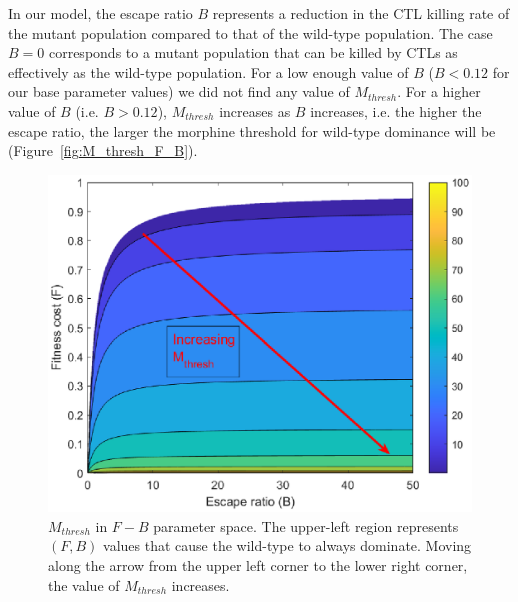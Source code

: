 \documentclass[11pt, oneside]{article}    %
\begin{document}
	In our model, the escape ratio $B$ represents a reduction in the CTL killing rate of the mutant population compared to that of the wild-type population. The case $B=0$ corresponds to a mutant population that can be killed by CTLs as effectively as the wild-type population. For a low enough value of $B$ ($B<0.12$ for our base parameter values) we did not find any value of $M_{thresh}$. For a higher value of $B$ (i.e. $B>0.12$), $M_{thresh}$ increases as $B$ increases, i.e. the higher the escape ratio, the larger the morphine threshold for wild-type dominance will be (Figure~\ref{fig:M_thresh_F_B}).


\begin{figure}[H]
\begin{center}
\includegraphics[scale=0.75]{FB_surf.eps}
\caption{$M_{thresh}$  in $F-B$ parameter space. The upper-left region represents $(F,B)$ values that cause the wild-type to always dominate. Moving along the arrow from the upper left corner to the lower right corner, the value of  $M_{thresh}$ increases.}
\label{fig:FB_surf}
\end{center}
\end{figure}
\end{document}
